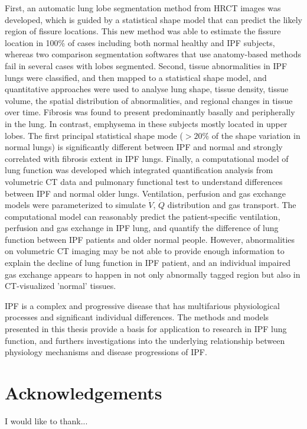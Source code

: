 \documentclass[a4paper, 12pt]{book}
\begin{document}
First, an automatic lung lobe segmentation method from HRCT images was developed, which is guided by a statistical shape model that can predict the likely region of fissure locations. This new method was able to estimate the fissure location in 100\% of cases including both normal healthy and IPF subjects, whereas two comparison segmentation softwares that use anatomy-based methods fail in several cases with lobes segmented. Second, tissue abnormalities in IPF lungs were classified, and then mapped to a statistical shape model, and quantitative approaches were used to analyse lung shape, tissue density, tissue volume, the spatial distribution of abnormalities, and regional changes in tissue over time. Fibrosis was found to present predominantly basally and peripherally in the lung. In contrast, emphysema in these subjects mostly located in upper lobes. The first principal statistical shape mode ($>20\%$ of the shape variation in normal lungs) is significantly different between IPF and normal and strongly correlated with fibrosis extent in IPF lungs. Finally, a computational model of lung function was developed which integrated quantification analysis from volumetric CT data and pulmonary functional test to understand differences between IPF and normal older lungs. Ventilation, perfusion and gas exchange models were parameterized to simulate $\dot{V}$, $\dot{Q}$ distribution and gas transport. The computational model can reasonably predict the patient-specific ventilation, perfusion and gas exchange in IPF lung, and quantify the difference of lung function between IPF patients and older normal people. However, abnormalities on volumetric CT imaging may be not able to provide enough information to explain the decline of lung function in IPF patient, and an individual impaired gas exchange appears to happen in not only abnormally tagged region but also in CT-visualized 'normal' tissues.

IPF is a complex and progressive disease that has multifarious physiological processes and significant individual differences. The methods and models presented in this thesis provide a basis for application to research in IPF lung function, and furthers investigations into the underlying relationship between physiology mechanisms and disease progressions of IPF.


\cleardoublepage
\chapter*{Acknowledgements}
I would like to thank...
\end{document}
